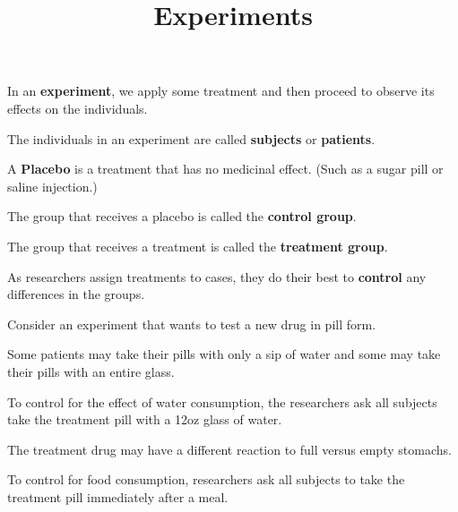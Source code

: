 \documentclass{beamer}
\title[MA205 - Section 1.4]{Experiments}
\begin{document}
\begin{frame}
\titlepage
\end{frame}

\begin{frame}
\begin{definition}
In an \textbf{experiment}, we apply some treatment and then proceed to observe its effects on the individuals.
\end{definition}\pause

\begin{definition}
The individuals in an experiment are called \textbf{subjects} or \textbf{patients}.
\end{definition}\pause

\begin{definition}
A \textbf{Placebo} is a treatment that has no medicinal effect. (Such as a sugar pill or saline injection.)
\end{definition}\pause

\begin{definition}
The group that receives a placebo is called the \textbf{control group}.
\end{definition}\pause

\begin{definition}
The group that receives a treatment is called the \textbf{treatment group}.
\end{definition}
\end{frame}

\begin{frame}
\begin{definition}
As researchers assign treatments to cases, they do their best to \textbf{control} any differences in the groups.
\end{definition}\pause

\begin{example}
Consider an experiment that wants to test a new drug in pill form.\pause

\vspace{2mm}
Some patients may take their pills with only a sip of water and some may take their pills with an entire glass.\pause

\vspace{2mm}
To control for the effect of water consumption, the researchers ask all subjects take the treatment pill with a 12oz glass of water.\pause

\vspace{2mm}
The treatment drug may have a different reaction to full versus empty stomachs.\pause

\vspace{2mm}
To control for food consumption, researchers ask all subjects to take the treatment pill immediately after a meal.
\end{example}
\end{frame}
\end{document}
